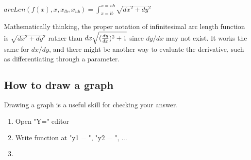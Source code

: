 \begin{enumerate}
                \begin{center}
                    $arcLen(f(x), x, x_{lb}, x_{ub}) = \int_{x=lb}^{x=ub} {\sqrt{dx^2 + dy^2}}$
                \end{center}

                Mathematically thinking, the proper notation of infinitesimal arc length function is $\sqrt{dx^2 + dy^2}$ rather than $dx\sqrt{({{dy}\over{dx}})^2 + 1}$ since $dy/dx$ may not exist. It works the same for $dx/dy$, and there might be another way to evaluate the derivative, such as differentiating through a parameter.
                
        \end{enumerate}


\subsection{How to draw a graph}
Drawing a graph is a useful skill for checking your answer.

\begin{enumerate}
    \item Open "Y=" editor
    \item Write function at "y1 = ", "y2 = ", ...
    \item 
\end{enumerate}